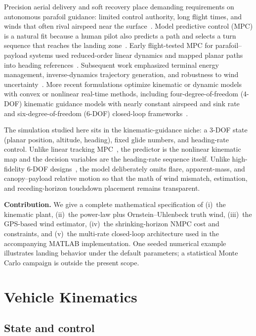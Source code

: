 \documentclass[conference]{IEEEtran}
\begin{document}
Precision aerial delivery and soft recovery place demanding requirements on autonomous parafoil guidance: limited control authority, long flight times, and winds that often rival airspeed near the surface~\cite{SlegersYakimenko2009,Rademacher2009}.
Model predictive control (MPC) is a natural fit because a human pilot also predicts a path and selects a turn sequence that reaches the landing zone~\cite{SlegersCostello2005}.
Early flight-tested MPC for parafoil--payload systems used reduced-order linear dynamics and mapped planar paths into heading references~\cite{SlegersCostello2005}.
Subsequent work emphasized terminal energy management, inverse-dynamics trajectory generation, and robustness to wind uncertainty~\cite{SlegersYakimenko2009,SlegersYakimenko2011,Rademacher2009}.
More recent formulations optimize kinematic or dynamic models with convex or nonlinear real-time methods, including four-degree-of-freedom (4-DOF) kinematic guidance models with nearly constant airspeed and sink rate~\cite{Leeman2022} and six-degree-of-freedom (6-DOF) closed-loop frameworks~\cite{Wei2024}.

The simulation studied here sits in the kinematic-guidance niche: a 3-DOF state (planar position, altitude, heading), fixed glide numbers, and heading-rate control.
Unlike linear tracking MPC~\cite{SlegersCostello2005}, the predictor is the nonlinear kinematic map and the decision variables are the heading-rate sequence itself.
Unlike high-fidelity 6-DOF designs~\cite{Wei2024,Zhao2023}, the model deliberately omits flare, apparent-mass, and canopy--payload relative motion so that the math of wind mismatch, estimation, and receding-horizon touchdown placement remains transparent.

\textbf{Contribution.}
We give a complete mathematical specification of (i)~the kinematic plant, (ii)~the power-law plus Ornstein--Uhlenbeck truth wind, (iii)~the GPS-based wind estimator, (iv)~the shrinking-horizon NMPC cost and constraints, and (v)~the multi-rate closed-loop architecture used in the accompanying MATLAB implementation.
One seeded numerical example illustrates landing behavior under the default parameters; a statistical Monte Carlo campaign is outside the present scope.

\section{Vehicle Kinematics}

\subsection{State and control}
\end{document}
